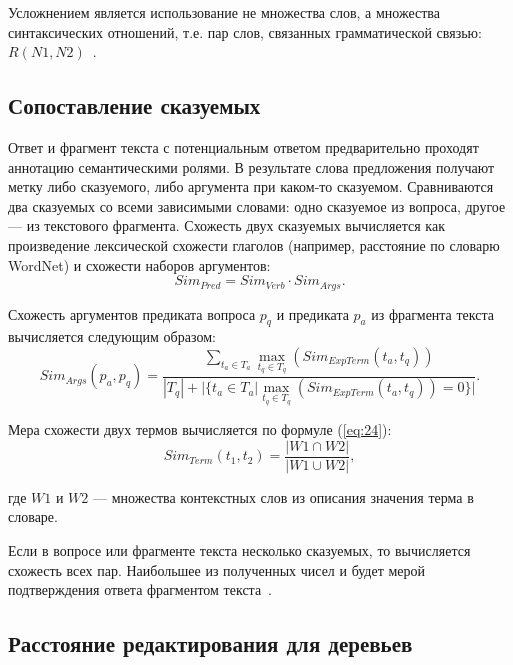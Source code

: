 Усложнением является использование не множества слов, а множества
синтаксических отношений, т.е. пар слов, связанных грамматической связью: $R(N1,N2)$~\cite{step4}.

\subsection{Сопоставление сказуемых}

Ответ и фрагмент текста с потенциальным ответом предварительно проходят аннотацию семантическими ролями. В результате слова предложения получают метку либо сказуемого, либо аргумента при каком-то сказуемом. Сравниваются два сказуемых со всеми зависимыми словами: одно сказуемое из вопроса, другое --- из текстового фрагмента. Схожесть двух сказуемых вычисляется как произведение лексической схожести глаголов (например, расстояние по словарю WordNet) и схожести наборов аргументов:
\begin{equation}\label{eq:22}
	Sim_{Pred} = Sim_{Verb} \cdot Sim_{Args}.
\end{equation} 

Схожесть аргументов предиката вопроса $p_q$ и предиката $p_a$ из фрагмента текста вычисляется следующим образом:
\begin{equation}\label{eq:23}
	Sim_{Args}(p_a, p_q) = \frac{\sum\limits_{t_a\in{T_a}}\max\limits_{t_q\in{T_q}}(Sim_{ExpTerm}(t_a, t_q))}
	{|T_q| + |\{t_a\in{T_a}|\max\limits_{t_q\in{T_q}}(Sim_{ExpTerm}(t_a, t_q)) = 0\}|}.
\end{equation}

Мера схожести двух термов вычисляется по формуле (\ref{eq:24}):
\begin{equation}\label{eq:24}
	Sim_{Term}(t_1, t_2) = \frac{|{W1}\cap{W2}|}{|{W1}\cup{W2}|},
\end{equation}

\noindent где $W1$ и $W2$ --- множества контекстных слов из описания значения терма в словаре.

Если в вопросе или фрагменте текста несколько сказуемых, то вычисляется схожесть всех пар.
Наибольшее из полученных чисел и будет мерой подтверждения ответа фрагментом текста~\cite{step4}.

\subsection{Расстояние редактирования для деревьев}

